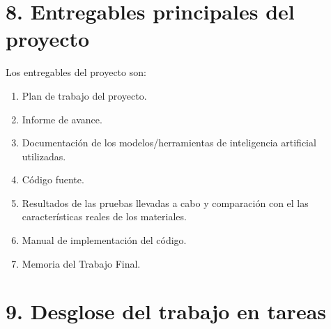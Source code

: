 \documentclass[
11pt, %
codirector, %
]{charter}
\begin{document}
\section{8. Entregables principales del proyecto}

Los entregables del proyecto son:

\begin{enumerate}
	\item Plan de trabajo del proyecto.
	\item Informe de avance.
	\item Documentación de los modelos/herramientas de inteligencia artificial utilizadas.
	\item Código fuente.
	\item Resultados de las pruebas llevadas a cabo y comparación con el las características reales de los materiales.
	\item Manual de implementación del código.
	\item Memoria del Trabajo Final.
\end{enumerate}


\section{9. Desglose del trabajo en tareas}
\label{sec:wbs}
\end{document}
